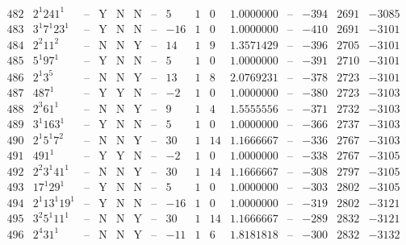 \documentclass[11pt,reqno,a4letter]{article}
\numberwithin{figure}{section}
\numberwithin{table}{section}
\theoremstyle{plain}
\numberwithin{theorem}{section}
\theoremstyle{definition}
\begin{document}
\begin{table}[h!]
\begin{equation*}
{\begin{array}{|cc|c|ccc|c|c|ccc|c|ccc}
 482 & 2^1 241^1 & \text{--} & \text{Y} & \text{N} & \text{N} & \text{--} & 5 & 1 & 0 & 1.0000000 & \text{--} & -394 & 2691 & -3085 \\
 483 & 3^1 7^1 23^1 & \text{--} & \text{Y} & \text{N} & \text{N} & \text{--} & -16 & 1 & 0 & 1.0000000 & \text{--} & -410 & 2691 & -3101 \\
 484 & 2^2 11^2 & \text{--} & \text{N} & \text{N} & \text{Y} & \text{--} & 14 & 1 & 9 & 1.3571429 & \text{--} & -396 & 2705 & -3101 \\
 485 & 5^1 97^1 & \text{--} & \text{Y} & \text{N} & \text{N} & \text{--} & 5 & 1 & 0 & 1.0000000 & \text{--} & -391 & 2710 & -3101 \\
 486 & 2^1 3^5 & \text{--} & \text{N} & \text{N} & \text{Y} & \text{--} & 13 & 1 & 8 & 2.0769231 & \text{--} & -378 & 2723 & -3101 \\
 487 & 487^1 & \text{--} & \text{Y} & \text{Y} & \text{N} & \text{--} & -2 & 1 & 0 & 1.0000000 & \text{--} & -380 & 2723 & -3103 \\
 488 & 2^3 61^1 & \text{--} & \text{N} & \text{N} & \text{Y} & \text{--} & 9 & 1 & 4 & 1.5555556 & \text{--} & -371 & 2732 & -3103 \\
 489 & 3^1 163^1 & \text{--} & \text{Y} & \text{N} & \text{N} & \text{--} & 5 & 1 & 0 & 1.0000000 & \text{--} & -366 & 2737 & -3103 \\
 490 & 2^1 5^1 7^2 & \text{--} & \text{N} & \text{N} & \text{Y} & \text{--} & 30 & 1 & 14 & 1.1666667 & \text{--} & -336 & 2767 & -3103 \\
 491 & 491^1 & \text{--} & \text{Y} & \text{Y} & \text{N} & \text{--} & -2 & 1 & 0 & 1.0000000 & \text{--} & -338 & 2767 & -3105 \\
 492 & 2^2 3^1 41^1 & \text{--} & \text{N} & \text{N} & \text{Y} & \text{--} & 30 & 1 & 14 & 1.1666667 & \text{--} & -308 & 2797 & -3105 \\
 493 & 17^1 29^1 & \text{--} & \text{Y} & \text{N} & \text{N} & \text{--} & 5 & 1 & 0 & 1.0000000 & \text{--} & -303 & 2802 & -3105 \\
 494 & 2^1 13^1 19^1 & \text{--} & \text{Y} & \text{N} & \text{N} & \text{--} & -16 & 1 & 0 & 1.0000000 & \text{--} & -319 & 2802 & -3121 \\
 495 & 3^2 5^1 11^1 & \text{--} & \text{N} & \text{N} & \text{Y} & \text{--} & 30 & 1 & 14 & 1.1666667 & \text{--} & -289 & 2832 & -3121 \\
 496 & 2^4 31^1 & \text{--} & \text{N} & \text{N} & \text{Y} & \text{--} & -11 & 1 & 6 & 1.8181818 & \text{--} & -300 & 2832 & -3132 \\

\end{array}}
\end{equation*}
\end{table}
\end{document}
